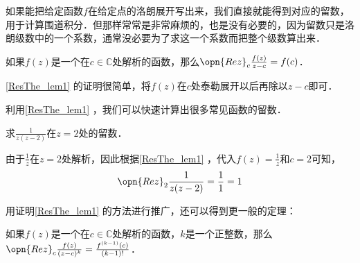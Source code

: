 如果能把给定函数$f$在给定点的洛朗展开写出来，我们直接就能得到对应的留数，用于计算围道积分．但那样常常是非常麻烦的，也是没有必要的，因为留数只是洛朗级数中的一个系数，通常没必要为了求这一个系数而把整个级数算出来．

\begin{lemma}{}\label{ResThe_lem1}
如果$f(z)$是一个在$c\in\mathbb{C}$处解析的函数，那么$\opn{Rez}_c\frac{f(z)}{z-c}=f(c)$．
\end{lemma}

\autoref{ResThe_lem1} 的证明很简单，将$f(z)$在$c$处泰勒展开以后再除以$z-c$即可．

利用\autoref{ResThe_lem1} ，我们可以快速计算出很多常见函数的留数．

\begin{example}{}
求$\frac{1}{z(z-2)}$在$z=2$处的留数．

由于$\frac{1}{z}$在$z=2$处解析，因此根据\autoref{ResThe_lem1} ，代入$f(z)=\frac{1}{z}$和$c=2$可知，
\begin{equation}
\opn{Rez}_2\frac{1}{z(z-2)}=\frac{1}{1}=1
\end{equation}
\end{example}

用证明\autoref{ResThe_lem1} 的方法进行推广，还可以得到更一般的定理：

\begin{theorem}{}
如果$f(z)$是一个在$c\in\mathbb{C}$处解析的函数，$k$是一个正整数，那么$\opn{Rez}_c\frac{f(z)}{(z-c)^k}=\frac{f^{(k-1)}(c)}{(k-1)!}$．
\end{theorem}






